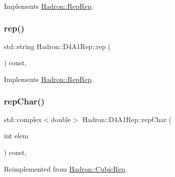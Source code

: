 Implements \mbox{\hyperlink{structHadron_1_1RepRep_ab3213025f6de249f7095892109575fde}{Hadron\+::\+Rep\+Rep}}.

\mbox{\label{structHadron_1_1D4A1Rep_a935e95f3ad80b6499e276424e3573730}} 
\subsubsection{\texorpdfstring{rep()}{rep()}\hspace{0.1cm}{\footnotesize\ttfamily [3/3]}}
{\footnotesize\ttfamily std\+::string Hadron\+::\+D4\+A1\+Rep\+::rep (\begin{DoxyParamCaption}{ }\end{DoxyParamCaption}) const\hspace{0.3cm}{\ttfamily [inline]}, {\ttfamily [virtual]}}



Implements \mbox{\hyperlink{structHadron_1_1RepRep_ab3213025f6de249f7095892109575fde}{Hadron\+::\+Rep\+Rep}}.

\mbox{\label{structHadron_1_1D4A1Rep_a45938f0cd557c639eedba39b63fabe29}} 
\subsubsection{\texorpdfstring{repChar()}{repChar()}\hspace{0.1cm}{\footnotesize\ttfamily [1/2]}}
{\footnotesize\ttfamily std\+::complex$<$double$>$ Hadron\+::\+D4\+A1\+Rep\+::rep\+Char (\begin{DoxyParamCaption}\item[{int}]{elem }\end{DoxyParamCaption}) const\hspace{0.3cm}{\ttfamily [inline]}, {\ttfamily [virtual]}}



Reimplemented from \mbox{\hyperlink{structHadron_1_1CubicRep_af45227106e8e715e84b0af69cd3b36f8}{Hadron\+::\+Cubic\+Rep}}.

